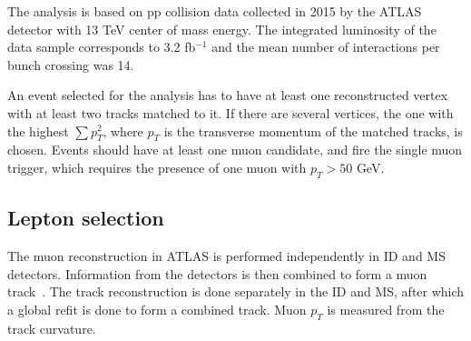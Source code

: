 The analysis is based on pp collision data collected in 2015 by the ATLAS detector with 13 TeV center of mass energy.
The integrated luminosity of the data sample corresponds to 3.2 fb$^{-1}$ and the mean number of interactions per bunch crossing was 14.

An event selected for the analysis has to have at least one reconstructed vertex with at least two tracks matched to it. 
If there are several vertices, the one with the highest
$\sum p^2_T$, where $p_T$ is the transverse momentum of the matched tracks, is chosen.
Events should have at least one muon candidate, and fire the single muon trigger, 
which requires the presence of one muon with $p_T > 50$ GeV.

\subsection{Lepton selection}
\label{subsec:lepton_selection}
The muon reconstruction in ATLAS is performed independently in ID and MS detectors. 
Information from the detectors is then combined to form a muon track~\cite{muon_performance_2015}.
The track reconstruction is done 
separately in the ID and MS, after which a global refit is done to form a combined track.
Muon $p_T$ is measured from the track curvature.


